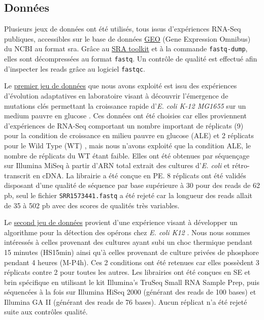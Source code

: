 \documentclass[12pt,a4paper]{report}
\begin{document}
\begin{onehalfspace}
\subsection*{Données}
Plusieurs jeux de données ont été utilisés, tous issus d'expériences RNA-Seq publiques, accessibles sur le base de données \href{http://www.ncbi.nlm.nih.gov/geo/}{GEO} (Gene Expression Omnibus) du NCBI au format \gls{sra}. Grâce au \href{http://www.ncbi.nlm.nih.gov/books/NBK158900/#SRA_download.how_do_i_use_the_sra_toolki}{SRA toolkit} et à la commande \texttt{fastq-dump}, elles sont décompressées au format \texttt{fastq}. Un contrôle de qualité est effectué afin d'inspecter les \gls{reads} grâce au logiciel \texttt{fastqc}.

Le \href{http://www.ncbi.nlm.nih.gov/geo/query/acc.cgi?acc=GSE61327}{premier jeu de données} que nous avons exploité est issu des expériences d'évolution adaptatives en laboratoire visant à découvrir l'émergence de mutations clés permettant la croissance rapide d'\textit{E. coli K-12 MG1655} sur un medium pauvre en glucose \citep{Lacroix2014}. Ces données ont été choisies car elles proviennent d'expériences de RNA-Seq comportant un nombre important de réplicats (9) pour la condition de croissance en milieu pauvre en glucose (ALE) et 2 réplicats pour le Wild Type (WT) , mais nous n'avons exploité que la condition ALE, le nombre de réplicats du WT étant faible. Elles ont été obtenues par séquençage sur Illumina MiSeq à partir d'ARN total extrait des cultures d'\textit{E. coli} et rétro-transcrit en cDNA. La librairie a été conçue en \gls{PE}. 8 réplicats ont été validés disposant d'une qualité de séquence par base supérieure à 30 pour des reads de 62 pb, seul le fichier \texttt{SRR1573441.fastq} a été rejeté car la longueur des reads allait de 35 à 502 pb avec des scores de qualités très variables.

Le \href{http://bioinfolab.uncc.edu/TruHmm_package/raw_data/}{second jeu de données} provient d'une expérience visant à développer un algorithme pour la détection des opérons chez \textit{E. coli K12} \citep{Li2013}. Nous nous sommes intéressés à celles provenant des cultures ayant subi un choc thermique pendant 15 minutes (HS15min) ainsi qu'à celles provenant de culture privées de phosphore pendant 4 heures (M-P4h). Ces 2 conditions ont été retenues car elles possèdent 3 réplicats contre 2 pour toutes les autres. Les librairies ont été conçues en \gls{SE} et brin spécifique en utilisant le kit Illumina’s TruSeq Small RNA Sample Prep, puis séquencées à la fois sur Illumina HiSeq 2000 (générant des reads de 100 bases) et Illumina GA II (générant des reads de 76 bases). Aucun réplicat n'a été rejeté suite aux contrôles qualité.


\end{onehalfspace}
\end{document}
